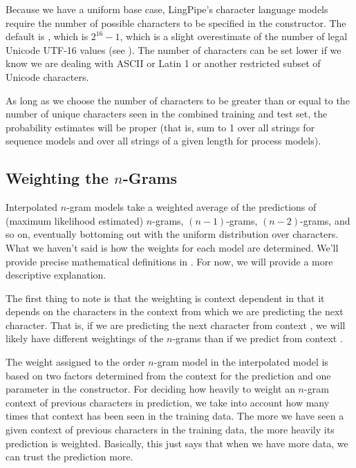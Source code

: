 Because we have a uniform base case, LingPipe's character language
models require the number of possible characters to be specified in
the constructor.  The default is , which is
$2^{16}-1$, which is a slight overestimate of the number of legal Unicode
UTF-16 values (see ).  The number of characters
can be set lower if we know we are dealing with ASCII or Latin 1 or
another restricted subset of Unicode characters.  

As long as we choose the number of characters to be greater than or
equal to the number of unique characters seen in the combined training and
test set, the probability estimates will be proper (that is, sum to
1 over all strings for sequence models and over all strings of a given
length for process models).


\subsection{Weighting the $n$-Grams}

Interpolated $n$-gram models take a weighted average of the
predictions of (maximum likelihood estimated) $n$-grams,
$(n-1)$-grams, $(n-2)$-grams, and so on, eventually bottoming out with
the uniform distribution over characters.  What we haven't said is how
the weights for each model are determined.  We'll provide precise
mathematical definitions in .  For now, we will
provide a more descriptive explanation.

The first thing to note is that the weighting is context dependent in
that it depends on the characters in the context from which we are
predicting the next character.  That is, if we are predicting the next
character from context , we will likely have
different weightings of the $n$-grams than if we predict from context
.

The weight assigned to the order $n$-gram model in the interpolated
model is based on two factors determined from the context for the
prediction and one parameter in the constructor.  For deciding how
heavily to weight an $n$-gram context of previous characters in
prediction, we take into account how many times that context has been
seen in the training data.  The more we have seen a given context of
previous characters in the training data, the more heavily its prediction
is weighted.  Basically, this just says that when we have more data,
we can trust the prediction more.  


